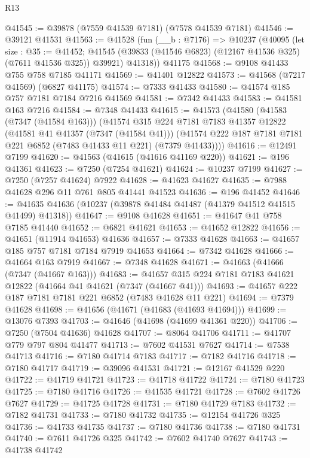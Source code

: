 \begin{lexlean}{R13}
\begin{coremodule}
@41545 := @39878 (@7559 @41539 @7181) (@7578 @41539 @7181)
@41546 := @39121 @41531
@41563 := @41528
    (fun (__b : @7176) =>
    @10237
      (@40095
        (let size : @35 := @41452;
        @41545 (@39833 (@41546 @6823) (@12167 @41536 @325) (@7611 @41536 @325)) @39921)
        @41318))
    @41175
@41568 := @9108 @41433 @755 @758 @7185 @41171
@41569 := @41401 @12822
@41573 := @41568 (@7217 @41569) (@6827 @41175)
@41574 := @7333 @41433
@41580 := @41574 @185 @757 @7181 @7184 @7216 @41569
@41581 := @7342 @41433
@41583 := @41581 @163 @7216
@41584 := @7348 @41433
@41615 := @41573
    (@41580
      (@41583 (@7347 (@41584 @163)))
      (@41574
        @315
        @224
        @7181
        @7183
        @41357
        @12822
        (@41581 @41 @41357 (@7347 (@41584 @41)))
        (@41574 @222 @187 @7181 @7181 @221 @6852 (@7483 @41433 @11 @221) (@7379 @41433))))
@41616 := @12491 @7199
@41620 := @41563 (@41615 (@41616 @41169 @220))
@41621 := @196 @41361
@41623 := @7250 (@7254 @41621)
@41624 := @10237 @7199
@41627 := @7250 (@7257 @41624) @7922
@41628 := @41623 @41627
@41635 := @7988 @41628 @296 @11 @761 @805 @41441 @41523
@41636 := @196 @41452
@41646 := @41635 @41636 (@10237 (@39878 @41484 @41487 (@41379 @41512 @41515 @41499) @41318))
@41647 := @9108 @41628
@41651 := @41647 @41 @758 @7185 @41440
@41652 := @6821 @41621
@41653 := @41652 @12822
@41656 := @41651 (@11914 @41653) @41636
@41657 := @7333 @41628
@41663 := @41657 @185 @757 @7181 @7184 @7919 @41653
@41664 := @7342 @41628
@41666 := @41664 @163 @7919
@41667 := @7348 @41628
@41671 := @41663 (@41666 (@7347 (@41667 @163)))
@41683 := @41657 @315 @224 @7181 @7183 @41621 @12822 (@41664 @41 @41621 (@7347 (@41667 @41)))
@41693 := @41657 @222 @187 @7181 @7181 @221 @6852 (@7483 @41628 @11 @221)
@41694 := @7379 @41628
@41698 := @41656 (@41671 (@41683 (@41693 @41694)))
@41699 := @13076 @7393
@41703 := @41646 (@41698 (@41699 @41361 @220))
@41706 := @7250 (@7504 @41636) @41628
@41707 := @8064 @41706
@41711 := @41707 @779 @797 @804 @41477
@41713 := @7602 @41531 @7627
@41714 := @7538 @41713
@41716 := @7180 @41714 @7183
@41717 := @7182 @41716
@41718 := @7180 @41717
@41719 := @39096 @41531
@41721 := @12167 @41529 @220
@41722 := @41719 @41721
@41723 := @41718 @41722
@41724 := @7180 @41723
@41725 := @7180 @41716
@41726 := @41535 @41721
@41728 := @7602 @41726 @7627
@41729 := @41725 @41728
@41731 := @7180 @41729 @7183
@41732 := @7182 @41731
@41733 := @7180 @41732
@41735 := @12154 @41726 @325
@41736 := @41733 @41735
@41737 := @7180 @41736
@41738 := @7180 @41731
@41740 := @7611 @41726 @325
@41742 := @7602 @41740 @7627
@41743 := @41738 @41742

\end{coremodule}
\end{lexlean}
